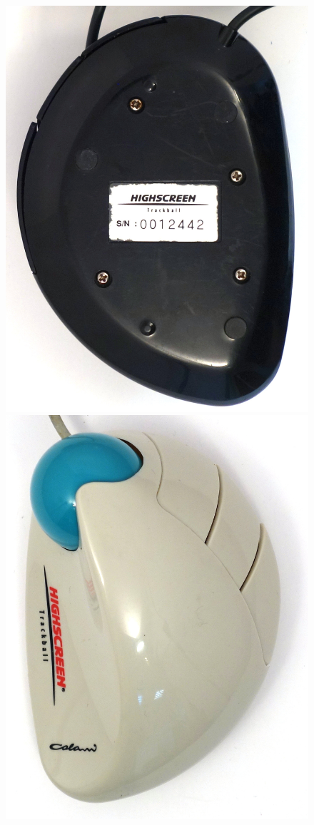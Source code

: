 \documentclass[11pt, a4paper]{article}
\begin{document}
\begin{figure}[h]
    \includegraphics[scale=0.51]{1993_colani_trackball/bottom_b_30.jpg}
    \includegraphics[scale=0.41]{1993_colani_trackball/top_w_30.jpg}

\end{figure}
\end{document}
